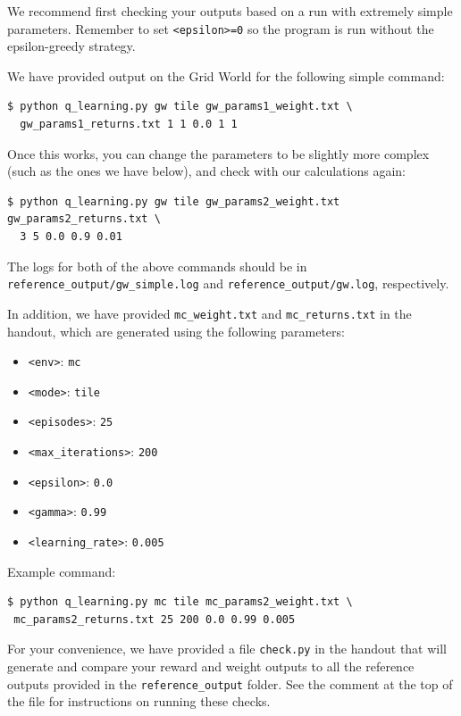 \documentclass[11pt,addpoints,answers]{exam}
\begin{document}
We recommend first checking your outputs based on a run with extremely simple parameters. Remember to set \texttt{<epsilon>=0} so the program is run without the epsilon-greedy strategy.

We have provided output on the Grid World for the following simple command:

\begin{lstlisting}[language=Shell]
$ python q_learning.py gw tile gw_params1_weight.txt \
  gw_params1_returns.txt 1 1 0.0 1 1
\end{lstlisting}

Once this works, you can change the parameters to be slightly more complex (such as the ones we have below), and check with our calculations again:

\begin{lstlisting}[language=Shell]
$ python q_learning.py gw tile gw_params2_weight.txt gw_params2_returns.txt \
  3 5 0.0 0.9 0.01
\end{lstlisting}

The logs for both of the above commands should be in \texttt{reference\_output/gw\_simple.log} and \texttt{reference\_output/gw.log}, respectively.

In addition, we have provided \texttt{mc\_weight.txt} and \texttt{mc\_returns.txt} in the handout, which are generated using the following parameters:
\begin{itemize}
    \item \texttt{<env>}: \texttt{mc}
    \item \texttt{<mode>}: \texttt{tile}
    \item \texttt{<episodes>}: \texttt{25}
    \item \texttt{<max\_iterations>}: \texttt{200}
    \item \texttt{<epsilon>}: \texttt{0.0}
    \item \texttt{<gamma>}: \texttt{0.99}
    \item \texttt{<learning\_rate>}: \texttt{0.005}
\end{itemize}

Example command:
\begin{lstlisting}[language=Shell]
$ python q_learning.py mc tile mc_params2_weight.txt \
 mc_params2_returns.txt 25 200 0.0 0.99 0.005
\end{lstlisting}

For your convenience, we have provided a file \texttt{check.py} in the handout that will generate and compare your reward and weight outputs to all the reference outputs provided in the \texttt{reference\_output} folder. See the comment at the top of the file for instructions on running these checks.
\end{document}
